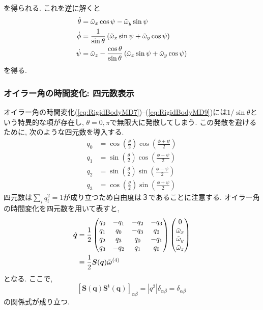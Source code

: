 を得られる. これを逆に解くと
\begin{align}
 \dot{\theta} &= \Tilde{\omega}_{x}\cos\psi - \Tilde{\omega}_{y}\sin\psi
\label{eq:RigidBodyMD7}
 \\
 \dot{\phi}   &= \frac{1}{\sin\theta}\left(\Tilde{\omega}_{x}\sin\psi + \Tilde{\omega}_{y} \cos\psi \right)
\label{eq:RigidBodyMD8}
 \\
 \dot{\psi}   &= \Tilde{\omega}_{z}- \frac{\cos\theta}{\sin\theta}\left(\Tilde{\omega}_{x}\sin\psi + \Tilde{\omega}_{y} \cos\psi \right)
 \label{eq:RigidBodyMD9}
\end{align}
を得る. 

\subsubsection{オイラー角の時間変化: 四元数表示}

オイラー角の時間変化(\ref{eq:RigidBodyMD7})--(\ref{eq:RigidBodyMD9})には$1/\sin \theta$という特異的な項が存在し, $\theta = 0, \pi$で無限大に発散してしまう.
この発散を避けるために, 次のような四元数を導入する. 
\begin{align}
 q_0 & = \cos\left(\frac{\theta}{2}\right)\cos\left(\frac{\phi+\psi}{2}\right)
 \label{eq:RigidBodyMD10}
 \\
 q_1 & = \sin\left(\frac{\theta}{2}\right)\cos\left(\frac{\phi-\psi}{2}\right)
 \label{eq:RigidBodyMD11}
 \\
 q_2 & = \sin\left(\frac{\theta}{2}\right)\sin\left(\frac{\phi-\psi}{2}\right)
\label{eq:RigidBodyMD12}
 \\
 q_3 & = \cos\left(\frac{\theta}{2}\right)\sin\left(\frac{\phi+\psi}{2}\right) 
\label{eq:RigidBodyMD13}
\end{align}
四元数は$\sum_{i}q_{i}^{2}=1$が成り立つため自由度は３であることに注意する.
オイラー角の時間変化を四元数を用いて表すと, 
\begin{align}
 \dot{\bm{q}}
  &=
  \frac{1}{2}
    \begin{pmatrix}
     q_{0} & -q_{1} & -q_{2} & -q_{3} \\
     q_{1} &  q_{0} & -q_{3} &  q_{2} \\
     q_{2} &  q_{3} &  q_{0} & -q_{1} \\
     q_{3} & -q_{2} &  q_{1} &  q_{0} \\
    \end{pmatrix}
 \begin{pmatrix}
  0                  \\
  \Tilde{\omega}_{x} \\
  \Tilde{\omega}_{y} \\
  \Tilde{\omega}_{z} \\
 \end{pmatrix}
\label{eq:RigidBodyMD14}
 \\
 &\equiv
 \frac{1}{2} \bm{S}(\bm{q}) \Tilde{\bm{\bm{\omega}}}^{(4)}
\label{eq:RigidBodyMD15}
\end{align}
となる. ここで, 
\begin{equation}
 \left[
  \bm{S}(\bm{q})\bm{S}^{\mathrm{t}}(\bm{q})
 \right]_{\alpha \beta}
 =
 |q^{2}| \delta_{\alpha \beta}
 =
 \delta_{\alpha \beta}
\label{eq:RigidBodyMD16}
\end{equation}
の関係式が成り立つ. 

